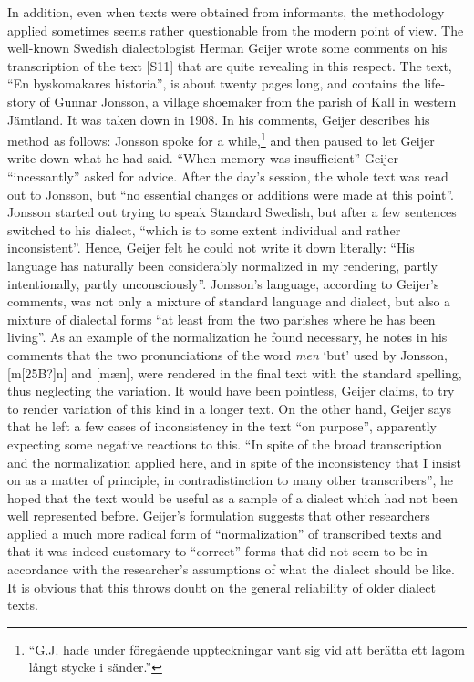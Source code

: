 
In addition, even when texts were obtained from informants, the methodology applied sometimes seems rather questionable from the modern point of view. The well-known Swedish dialectologist Herman Geijer wrote some comments on his transcription of the text [S11] that are quite revealing in this respect. The text, “En byskomakares historia”, is about twenty pages long, and contains the life-story of Gunnar Jonsson, a village shoemaker from the parish of Kall in western Jämtland. It was taken down in 1908. In his comments, Geijer describes his method as follows: Jonsson spoke for a while,\footnote{ “G.J. hade under föregående uppteckningar vant sig vid att berätta ett lagom långt stycke i sänder.”} and then paused to let Geijer write down what he had said. “When memory was insufficient” Geijer “incessantly” asked for advice. After the day’s session, the whole text was read out to Jonsson, but “no essential changes or additions were made at this point”. Jonsson started out trying to speak Standard Swedish, but after a few sentences switched to his dialect, “which is to some extent individual and rather inconsistent”. Hence, Geijer felt he could not write it down literally: “His language has naturally been considerably normalized in my rendering, partly intentionally, partly unconsciously”. Jonsson’s language, according to Geijer’s comments, was not only a mixture of standard language and dialect, but also a mixture of dialectal forms “at least from the two parishes where he has been living”. As an example of the normalization he found necessary, he notes in his comments that the two pronunciations of the word \textit{men} ‘but’ used by Jonsson, [m[25B?]n] and [mæn], were rendered in the final text with the standard spelling, thus neglecting the variation. It would have been pointless, Geijer claims, to try to render variation of this kind in a longer text. On the other hand, Geijer says that he left a few cases of inconsistency in the text “on purpose”, apparently expecting some negative reactions to this. “In spite of the broad transcription and the normalization applied here, and in spite of the inconsistency that I insist on as a matter of principle, in contradistinction to many other transcribers”, he hoped that the text would be useful as a sample of a dialect which had not been well represented before. Geijer’s formulation suggests that other researchers applied a much more radical form of “normalization” of transcribed texts and that it was indeed customary to “correct” forms that did not seem to be in accordance with the researcher’s assumptions of what the dialect should be like. It is obvious that this throws doubt on the general reliability of older dialect texts.

